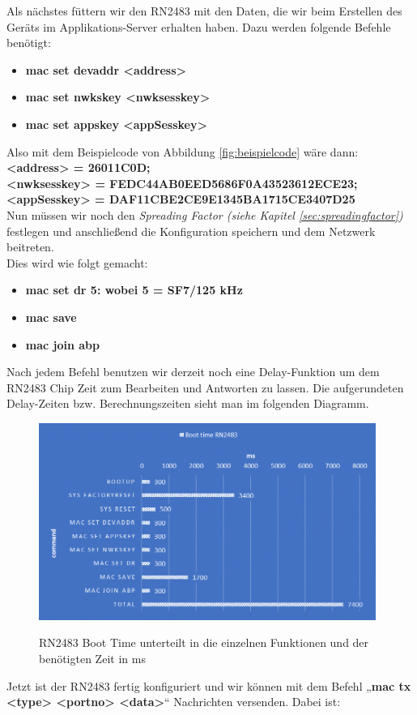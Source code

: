 \noindent
Als nächstes füttern wir den RN2483 mit den Daten, die wir beim Erstellen des Geräts im Applikations-Server erhalten haben. Dazu werden folgende Befehle benötigt:
\begin{itemize}
    \item \textbf{mac set devaddr <address>}
    \item \textbf{mac set nwkskey <nwksesskey>}
    \item \textbf{mac set appskey <appSesskey>}
\end{itemize}
Also mit dem Beispielcode von Abbildung \ref{fig:beispielcode} wäre dann:\\
\textbf{<address> = 26011C0D;}\\
\textbf{<nwksesskey> = FEDC44AB0EED5686F0A43523612ECE23;}\\
\textbf{<appSesskey> = DAF11CBE2CE9E1345BA1715CE3407D25}\\

\noindent
Nun müssen wir noch den \textit{Spreading Factor (siehe Kapitel \ref{sec:spreadingfactor})} festlegen und anschließend die Konfiguration speichern und dem Netzwerk beitreten.\\
Dies wird wie folgt gemacht: 

\begin{itemize}
    \item \textbf{mac set dr 5: wobei 5 = SF7/125 kHz}
    \item \textbf{mac save}
    \item \textbf{mac join abp}
\end{itemize}

\noindent
Nach jedem Befehl benutzen wir derzeit noch eine Delay-Funktion um dem RN2483 Chip Zeit zum Bearbeiten und Antworten zu lassen. Die aufgerundeten Delay-Zeiten bzw. Berechnungszeiten sieht man im folgenden Diagramm.

\begin{figure}[H]
    \center
    \includegraphics[width=11cm]{Bilder/lora-9.png}\\
    \caption{RN2483 Boot Time unterteilt in die einzelnen Funktionen und der benötigten Zeit in ms}
    \label{fig:boot-time}
\end{figure}
\noindent
Jetzt ist der RN2483 fertig konfiguriert und wir können mit dem Befehl „\textbf{mac tx <type> <portno> <data>}“ Nachrichten versenden. Dabei ist:\\

